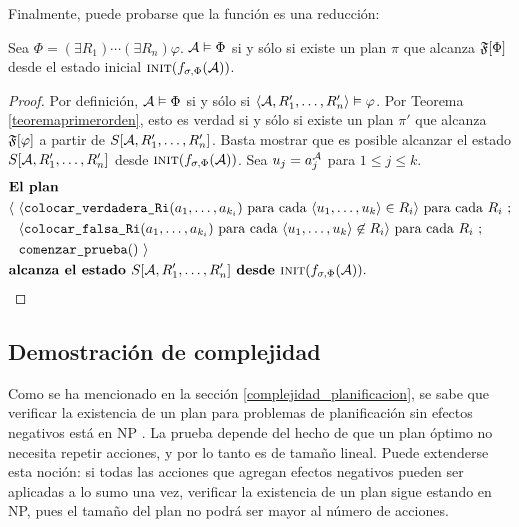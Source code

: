 Finalmente, puede probarse que la función es una reducción:
\begin{theorem}
Sea $\Phi = (\exists R_1)\cdots(\exists R_n) \varphi$.
$\mathcal{A} \vDash \Phi$ si y sólo si existe un plan $\pi$ que alcanza $\mathfrak{F}[\Phi]$
desde el estado inicial $\textsc{init}(f_{\sigma,\Phi}(\mathcal{A}))$.
\end{theorem}
\begin{proof}
Por definición, $\mathcal{A} \vDash \Phi$ si y sólo si
$\langle \mathcal{A}, R_1',\ldots,R_n' \rangle \vDash \varphi$.
Por Teorema \ref{teoremaprimerorden}, esto es verdad si y sólo si 
existe un plan $\pi'$ que alcanza $\mathfrak{F}[\varphi]$ a partir de $S[\mathcal{A},
R_1',\ldots,R_n']$.
Basta mostrar que es posible alcanzar el estado $S[\mathcal{A}, R_1',\ldots,R_n']$ desde
$\textsc{init}(f_{\sigma,\Phi}(\mathcal{A}))$. Sea $u_j = a_j^{\mathcal{A}}$ para $1 \leq j \leq k$.
\begin{alignat*}{1}
& \textbf{El plan }\\
& \langle \ \tup{\texttt{colocar\_verdadera\_Ri}(a_1,\ldots,a_{k_i}) 
\text{ para cada } \tup{u_1,\ldots,u_k} \in R_i} \text{ para cada } R_i \ ;\\
& {\color{white} \langle \ } \tup{\texttt{colocar\_falsa\_Ri}(a_1,\ldots,a_{k_i}) \text { para cada
} \tup{u_1,\ldots,u_k} \not\in R_i} \text{ para cada } R_i\ ;\\
& {\color{white} \langle \ } \texttt{comenzar\_prueba}()\ \rangle\\
& \textbf{alcanza el estado } S[\A, R_1',\ldots,R_n'] \textbf{ desde }
\textsc{init}(f_{\sigma,\Phi}(\A)).
\end{alignat*}
\end{proof}

\subsection{Demostración de complejidad}
Como se ha mencionado en la sección \ref{complejidad_planificacion}, 
se sabe que verificar la existencia de un plan para 
problemas de planificación
sin efectos negativos está en NP \citep{bylander:plan-complexity}. La prueba
depende del hecho de que un plan óptimo no necesita repetir acciones, y por lo
tanto es de tamaño lineal. Puede extenderse esta noción: si todas las acciones que
agregan efectos negativos pueden ser aplicadas a lo sumo una vez, verificar la
existencia de un plan sigue estando en NP, pues el tamaño del plan no podrá ser
mayor al número de acciones.

